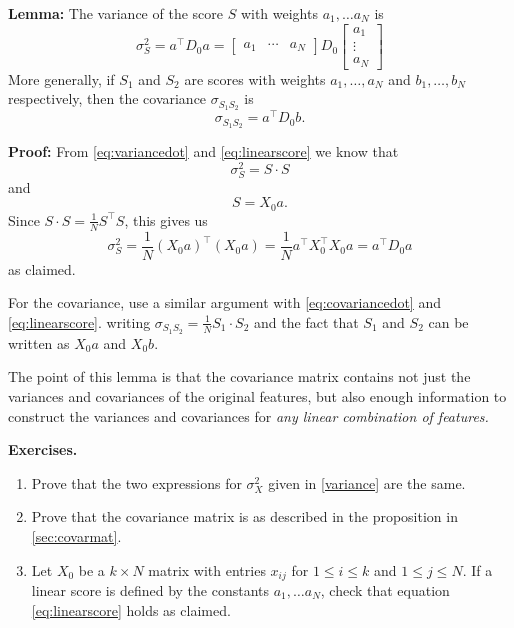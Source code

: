 \documentclass[]{article}
\begin{document}
\textbf{Lemma:} The variance of the score \(S\) with weights
\(a_1,\ldots a_N\) is \begin{equation}
\sigma_{S}^2 = a^{\intercal}D_{0}a = \left[\begin{matrix}a_{1} & \cdots & a_{N}\end{matrix}\right]D_{0}
\left[\begin{matrix} a_{1} \\ \vdots \\ a_{N}\end{matrix}\right]
\label{eq:ada}\end{equation} More generally, if \(S_{1}\) and \(S_{2}\)
are scores with weights \(a_1,\ldots, a_N\) and \(b_1,\ldots, b_N\)
respectively, then the covariance \(\sigma_{S_{1}S_{2}}\) is \[
\sigma_{S_{1}S_{2}} = a^{\intercal}D_{0}b.
\]

\textbf{Proof:} From \cref{eq:variancedot} and \ref{eq:linearscore} we
know that \[
\sigma_{S}^2 = S\cdot S
\] and \[
S = X_{0}a.
\] Since \(S\cdot S = \frac{1}{N}S^{\intercal}S\), this gives us \[
\sigma_{S}^2 = \frac{1}{N}(X_{0}a)^{\intercal}(X_{0}a) = \frac{1}{N}a^{\intercal}X_{0}^{\intercal}X_{0}a = a^{\intercal}D_{0}a
\] as claimed.

For the covariance, use a similar argument with \cref{eq:covariancedot}
and \cref{eq:linearscore}. writing
\(\sigma_{S_{1}S_{2}}=\frac{1}{N}S_{1}\cdot S_{2}\) and the fact that
\(S_{1}\) and \(S_{2}\) can be written as \(X_{0}a\) and \(X_{0}b\).

The point of this lemma is that the covariance matrix contains not just
the variances and covariances of the original features, but also enough
information to construct the variances and covariances for \emph{any
linear combination of features.}

\textbf{Exercises.}

\begin{enumerate}
\def\labelenumi{\arabic{enumi}.}
\item
  Prove that the two expressions for \(\sigma_{X}^2\) given in
  \cref{variance} are the same.
\item
  Prove that the covariance matrix is as described in the proposition in
  \ref{sec:covarmat}.
\item
  Let \(X_{0}\) be a \(k\times N\) matrix with entries \(x_{ij}\) for
  \(1\le i\le k\) and \(1\le j\le N\). If a linear score is defined by
  the constants \(a_{1},\ldots a_{N}\), check that equation
  \cref{eq:linearscore} holds as claimed.
\end{enumerate}
\end{document}
